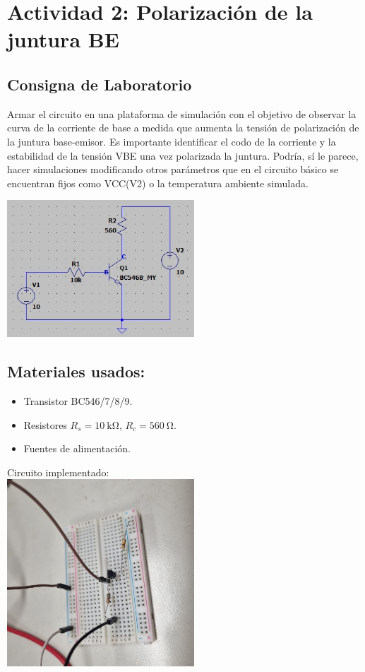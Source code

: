 \newpage

\section{Actividad 2: Polarización de la juntura BE}


\subsection{Consigna de Laboratorio}
Armar el circuito en una plataforma de simulación con el objetivo de observar la curva de la corriente de base a medida que aumenta la tensión de polarización de la juntura base-emisor. Es importante identificar el codo de la corriente y la estabilidad de la tensión VBE una vez polarizada la juntura. Podría, sí le parece, hacer simulaciones modificando otros parámetros que en el circuito básico se encuentran fijos como VCC(V2) o la temperatura ambiente simulada.

\includegraphics[width=7cm]{./imagenes/Circuito2.jpg}




\subsection{Materiales usados:}
\begin{itemize}
    \item Transistor BC546/7/8/9.
    \item Resistores $R_s = \SI{10}{\kilo\ohm}$, $R_c = \SI{560}{\ohm}$.
    \item Fuentes de alimentación.
\end{itemize}

Circuito implementado:\\

\includegraphics[width=7cm]{./imagenes/Lab1.jpg}


